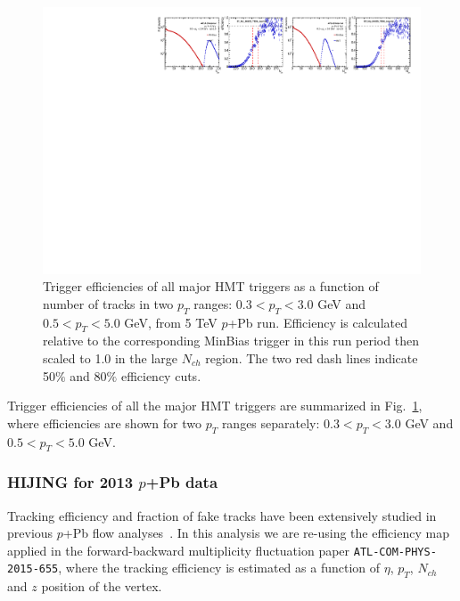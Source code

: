 \begin{figure}[H]
\centering
\includegraphics[width=1.\linewidth]{figs/sec_evtSlc/trigEff_pPb5_run1/trigEff_Trig13.pdf}
\caption{Trigger efficiencies of all major HMT triggers as a function of number of tracks in two $p_{T}$ ranges: $0.3<p_{T}<3.0$ GeV and $0.5<p_{T}<5.0$ GeV, from 5 TeV $p$+Pb run. Efficiency is calculated relative to the corresponding MinBias trigger in this run period then scaled to 1.0 in the large $N_{ch}$ region. The two red dash lines indicate 50$\%$ and 80$\%$ efficiency cuts.}
\label{fig:trigEff_pPb5_run1}
\end{figure}
Trigger efficiencies of all the major HMT triggers are summarized in Fig.~\ref{fig:trigEff_pPb5_run1}, where efficiencies are shown for two $p_{T}$ ranges separately: $0.3<p_{T}<3.0$ GeV and $0.5<p_{T}<5.0$ GeV.



\subsubsection{HIJING for 2013 $p$+Pb data}
Tracking efficiency and fraction of fake tracks have been extensively studied in previous $p$+Pb flow analyses~\cite{Aad:2014lta, atlas:3}. In this analysis we are re-using the efficiency map applied in the forward-backward multiplicity fluctuation paper \verb|ATL-COM-PHYS-2015-655|, where the tracking efficiency is estimated as a function of $\eta$, $p_{T}$, $N_{ch}$ and $z$ position of the vertex.



